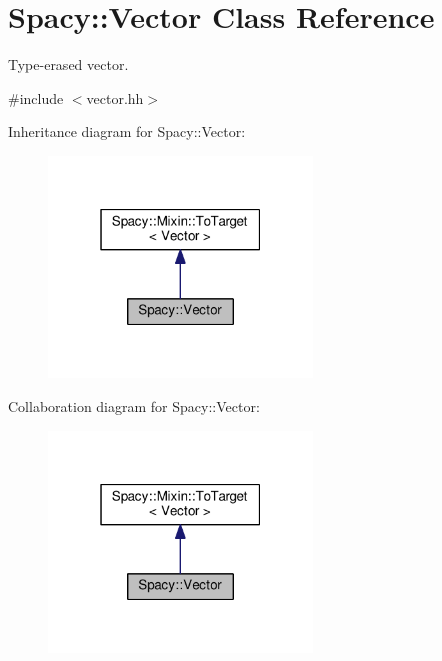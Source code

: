 \hypertarget{classSpacy_1_1Vector}{}\section{Spacy\+:\+:Vector Class Reference}
\label{classSpacy_1_1Vector}


Type-\/erased vector.  




{\ttfamily \#include $<$vector.\+hh$>$}



Inheritance diagram for Spacy\+:\+:Vector\+:\nopagebreak
\begin{figure}[H]
\begin{center}
\leavevmode
\includegraphics[width=199pt]{classSpacy_1_1Vector__inherit__graph}
\end{center}
\end{figure}


Collaboration diagram for Spacy\+:\+:Vector\+:\nopagebreak
\begin{figure}[H]
\begin{center}
\leavevmode
\includegraphics[width=199pt]{classSpacy_1_1Vector__coll__graph}
\end{center}
\end{figure}
